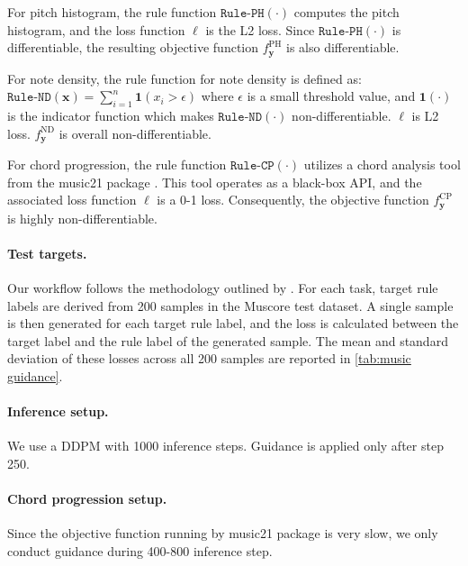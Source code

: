 For pitch histogram, the rule function $\texttt{Rule-PH}(\cdot)$ computes the pitch histogram, and the loss function $\ell$ is the L2 loss. Since $\texttt{Rule-PH}(\cdot)$ is differentiable, the resulting objective function $f_{\boldsymbol{y}}^{\text{PH}}$ is also differentiable.

For note density, the rule function for note density is defined as: $\texttt{Rule-ND}(\boldsymbol{x}) = \sum_{i=1}^n \mathbf{1}(x_i > \epsilon) $ where $\epsilon$ is a small threshold value, and $\mathbf{1}(\cdot)$ is the indicator function which makes $\texttt{Rule-ND}(\cdot)$ non-differentiable. $\ell$ is L2 loss. $f_{\boldsymbol{y}}^{\text{ND}}$ is overall non-differentiable.

For chord progression, the rule function $\texttt{Rule-CP}(\cdot)$ utilizes a chord analysis tool from the music21 package \cite{cuthbert2010music21}. This tool operates as a black-box API, and the associated loss function $\ell$ is a 0-1 loss. Consequently, the objective function $f_{\boldsymbol{y}}^{\text{CP}}$ is highly non-differentiable.





\paragraph{Test targets.} Our workflow follows the methodology outlined by \citet{huang2024symbolic}. For each task, target rule labels are derived from 200 samples in the Muscore test dataset. A single sample is then generated for each target rule label, and the loss is calculated between the target label and the rule label of the generated sample. The mean and standard deviation of these losses across all 200 samples are reported in \cref{tab:music guidance}.



\paragraph{Inference setup.} We use a DDPM with 1000 inference steps. Guidance is applied only after step 250.



\paragraph{Chord progression setup.} Since the objective function running by music21 package \cite{cuthbert2010music21} is very slow, we only conduct guidance during 400-800 inference step.



